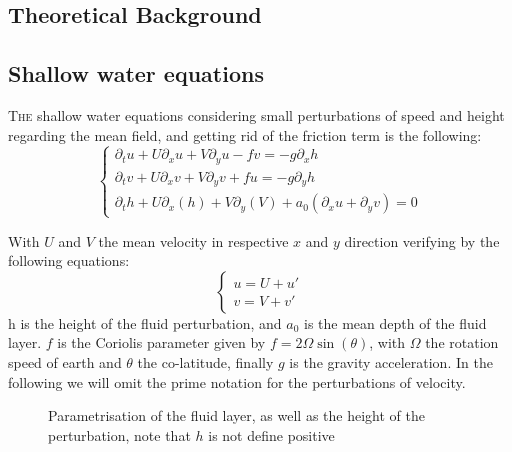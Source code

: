 \documentclass[11pt,a4paper]{report}
\begin{document}
\begin{multicols}{2}
    \chapter{Theoretical Background}
    \section{Shallow water equations}
    \lettrine[lines=2, lhang=.3, nindent=0pt]{\color{black} T}{he} shallow water equations considering small perturbations of speed and height regarding the mean field, and getting rid of the friction term is the following:
    \begin{equation*}
        \begin{cases}
            \partial_t u + U \partial_x u + V \partial_y u - fv = -g \partial_x h \\
            \partial_t v + U \partial_x v + V \partial_y v + fu = -g \partial_y h \\
            \partial_t h + U\partial_x (h) + V\partial_y (V) + a_0( \partial_x u + \partial_y v) = 0
        \end{cases}
    \end{equation*}

    With $U$ and $V$ the mean velocity in respective $x$ and $y$ direction verifying by the following equations:
    \begin{equation*}
        \begin{cases}
            u = U + u' \\
            v = V + v'
        \end{cases}
    \end{equation*}
    h is the height of the fluid perturbation, and $a_0$ is the mean depth of the fluid layer. $f$ is the Coriolis parameter given by $f = 2\Omega \sin (\theta)$, with $\Omega$ the rotation speed of earth and $\theta$ the co-latitude, finally $g$ is the gravity acceleration.
    In the following we will omit the prime notation for the perturbations of velocity.

    \begin{figure}[H]
        \def\svgwidth{1.2\linewidth}
        
        \caption{\footnotesize{Parametrisation of the fluid layer, as well as the height of the perturbation,
                note that $h$ is not define positive}}
        \label{fig:param}
    \end{figure}



\end{multicols}
\end{document}

